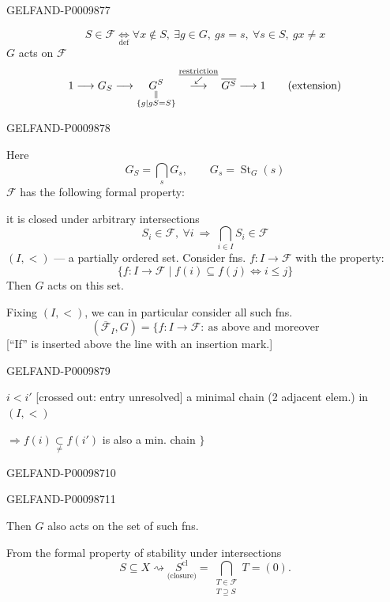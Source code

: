 \begin{GelfandAdjacentEvidence}{GELFAND-P000987}{7}

\[
S\in\mathcal F\underset{\mathrm{def}}{\Longleftrightarrow}
\forall x\notin S,\ \exists g\in G,\ gs=s,\ \forall s\in S,\ gx\ne x
\]
$G$ acts on $\mathcal F$
\[
1\longrightarrow G_S\longrightarrow
\underset{\substack{\Vert\\\{g\mid gS=S\}}}{G^S}
\overset{\substack{\text{\underline{restriction}}\\\swarrow}}{\longrightarrow}
\overline{G^S}\longrightarrow 1
\qquad\text{(extension)}
\]
\end{GelfandAdjacentEvidence}
\begin{GelfandAdjacentEvidence}{GELFAND-P000987}{8}


Here
\[
G_S=\bigcap_sG_s,\qquad G_s=\operatorname{St}_G(s)
\]
$\mathcal F$ has the following formal property:

it is closed under arbitrary intersections
\[
S_i\in\mathcal F,\ \forall i\ \Rightarrow\ \bigcap_{i\in I}S_i\in\mathcal F
\]
$(I,<)$ --- a partially ordered set. Consider fns. $f:I\to\mathcal F$ with the property:
\[
\{f:I\to\mathcal F\mid f(i)\subseteq f(j)\Longleftrightarrow i\le j\}
\]
Then $G$ acts on this set.

Fixing $(I,<)$, we can in particular consider all such fns.
\[
(\overline{\mathcal F}_I,G)=\{f:I\to\mathcal F:\ \text{as above and moreover}
\]
[“If” is inserted above the line with an insertion mark.]
\end{GelfandAdjacentEvidence}
\begin{GelfandAdjacentEvidence}{GELFAND-P000987}{9}


$i<i'$ [crossed out: entry unresolved] a minimal chain (2 adjacent elem.) in $(I,<)$

$\Rightarrow f(i)\underset{\ne}{\subset} f(i')$ is also a min. chain $\}$
\end{GelfandAdjacentEvidence}
\begin{GelfandAdjacentEvidence}{GELFAND-P000987}{10}


\end{GelfandAdjacentEvidence}
\begin{GelfandAdjacentEvidence}{GELFAND-P000987}{11}


Then $G$ also acts on the set of such fns.

From the formal property of stability under intersections
\[
S\subseteq X\rightsquigarrow
\underset{\text{(closure)}}{S^{\mathrm{cl}}}
=\bigcap_{\substack{T\in\mathcal F\\ T\supseteq S}}T=(0).
\]
\end{GelfandAdjacentEvidence}



